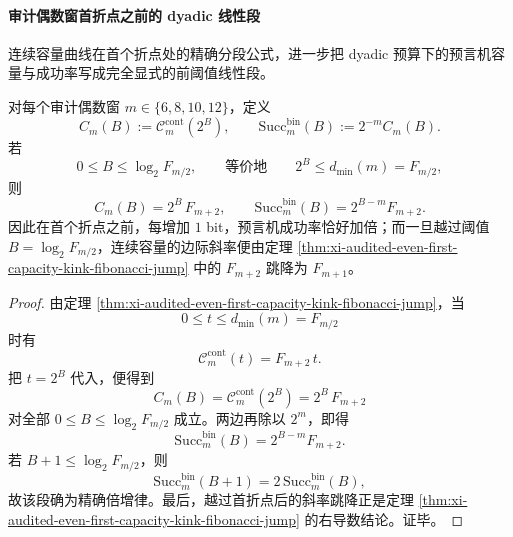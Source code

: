 \paragraph{审计偶数窗首折点之前的 dyadic 线性段}
连续容量曲线在首个折点处的精确分段公式，进一步把 dyadic 预算下的预言机容量与成功率写成完全显式的前阈值线性段。

\begin{corollary}\label{cor:xi-audited-even-dyadic-first-capacity-linear-regime}
对每个审计偶数窗 \(m\in\{6,8,10,12\}\)，定义
\[
C_m(B):=\mathcal C_m^{\mathrm{cont}}(2^B),
\qquad
\mathrm{Succ}_m^{\mathrm{bin}}(B):=2^{-m}C_m(B).
\]
若
\[
0\le B\le \log_2 F_{m/2},
\qquad\text{等价地}\qquad
2^B\le d_{\min}(m)=F_{m/2},
\]
则
\[
C_m(B)=2^B\,F_{m+2},
\qquad
\mathrm{Succ}_m^{\mathrm{bin}}(B)=2^{B-m}F_{m+2}.
\]
因此在首个折点之前，每增加 \(1\) bit，预言机成功率恰好加倍；而一旦越过阈值 \(B=\log_2 F_{m/2}\)，连续容量的边际斜率便由定理 \ref{thm:xi-audited-even-first-capacity-kink-fibonacci-jump} 中的 \(F_{m+2}\) 跳降为 \(F_{m+1}\)。
\end{corollary}
\begin{proof}
由定理 \ref{thm:xi-audited-even-first-capacity-kink-fibonacci-jump}，当
\[
0\le t\le d_{\min}(m)=F_{m/2}
\]
时有
\[
\mathcal C_m^{\mathrm{cont}}(t)=F_{m+2}\,t.
\]
把 \(t=2^B\) 代入，便得到
\[
C_m(B)=\mathcal C_m^{\mathrm{cont}}(2^B)=2^B\,F_{m+2}
\]
对全部 \(0\le B\le \log_2 F_{m/2}\) 成立。两边再除以 \(2^m\)，即得
\[
\mathrm{Succ}_m^{\mathrm{bin}}(B)=2^{B-m}F_{m+2}.
\]
若 \(B+1\le \log_2 F_{m/2}\)，则
\[
\mathrm{Succ}_m^{\mathrm{bin}}(B+1)=2\,\mathrm{Succ}_m^{\mathrm{bin}}(B),
\]
故该段确为精确倍增律。最后，越过首折点后的斜率跳降正是定理 \ref{thm:xi-audited-even-first-capacity-kink-fibonacci-jump} 的右导数结论。证毕。
\end{proof}

\endinput
